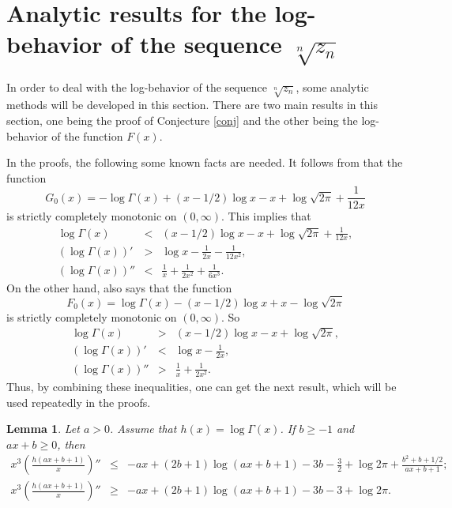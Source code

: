 \documentclass[12pt,reqno]{article}
\newtheorem{lem}[thm]{Lemma}
\theoremstyle{definition}
\numberwithin{equation}{section}
\begin{document}
\section{Analytic results for the
log-behavior of the sequence $\sqrt[n]{z_n}$}

In order to deal with the log-behavior of the sequence
$\sqrt[n]{z_n}$, some analytic methods will be developed in this
section. There are two main results in this section, one being the
proof of Conjecture \ref{conj} and the other being the log-behavior
of the function $F(x)$.

In the proofs, the following some known facts are needed. It follows
from \cite[Theorem 8]{Al97} that the function
$$G_0(x)=-\log{\Gamma(x)}+(x-1/2)\log{x}-x+\log{\sqrt{2\pi}}+\frac{1}{12x}$$
is strictly completely monotonic on $(0, \infty)$. This implies that
\begin{eqnarray}
\log{\Gamma(x)}&<&(x-1/2)\log{x}-x+\log{\sqrt{2\pi}}+\frac{1}{12x},\label{gama+1}\\
\left(\log{\Gamma(x)}\right)'&>&\log{x}-\frac{1}{2x}-\frac{1}{12x^2},\label{gama+2}\\
\left(\log{\Gamma(x)}\right)''&<&\frac{1}{x}+\frac{1}{2x^2}+\frac{1}{6x^3}.\label{gama+3}
\end{eqnarray}
On the other hand, \cite[Theorem 8]{Al97} also says that the
function
$$F_0(x)=\log{\Gamma(x)}-(x-1/2)\log{x}+x-\log{\sqrt{2\pi}}$$
is strictly completely monotonic on $(0, \infty)$. So
\begin{eqnarray}
\log{\Gamma(x)}&>&(x-1/2)\log{x}-x+\log{\sqrt{2\pi}},\label{gama+4}\\
\left(\log{\Gamma(x)}\right)'&<&\log{x}-\frac{1}{2x},\label{gama+5}\\
\left(\log{\Gamma(x)}\right)''&>&\frac{1}{x}+\frac{1}{2x^2}.\label{gama+6}
\end{eqnarray}
Thus, by combining these inequalities, one can get the next result,
which will be used repeatedly in the proofs.
\begin{lem}\label{bound+gama}
Let $a>0$. Assume that $h(x)=\log{\Gamma(x)}$. If $b\geq -1$ and
$ax+b\geq0$, then
\begin{eqnarray*}
x^3\left(\frac{h(ax+b+1)}{x}\right)''&\leq&-ax+(2b+1)\log{(ax+b+1)}-3b-\frac{3}{2}+\log{2\pi}+\frac{b^2+b+1/2}{ax+b+1};\\
x^3\left(\frac{h(ax+b+1)}{x}\right)''&\geq&-ax+(2b+1)\log{(ax+b+1)}-3b-3+\log{2\pi}.
\end{eqnarray*}
\end{lem}
\end{document}

